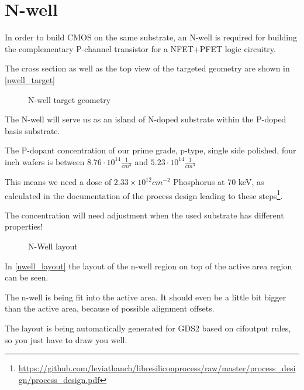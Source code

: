 \section{N-well}\label{nwell_chapter}
In order to build CMOS on the same substrate, an N-well is required for building the complementary P-channel transistor for a NFET+PFET logic circuitry.

The cross section as well as the top view of the targeted geometry are shown in \autoref{nwell_target}

\begin{figure}[H]
	\centering
	\begin{tikzpicture}[node distance = 3cm, auto, thick,scale=\CrossAndTopSectionBig, every node/.style={transform shape}]
		
	\end{tikzpicture}
	\begin{tikzpicture}[node distance = 3cm, auto, thick,scale=\CrossAndTopSectionBig, every node/.style={transform shape}]
		
	\end{tikzpicture}
	\caption{N-well target geometry}
	\label{nwell_target}
\end{figure}

The N-well will serve us as an island of N-doped substrate within the P-doped basis substrate.

The P-dopant concentration of our prime grade, p-type, single side polished, four inch wafers is between $8.76 \cdot 10^14 \frac{1}{cm^3}$ and $5.23 \cdot 10^14 \frac{1}{cm^3}$

This means we need a dose of $2.33\times10^{12}cm^{-2}$ Phosphorus at 70 keV, as calculated in the documentation of the process design leading to these steps\footnote{\url{https://github.com/leviathanch/libresiliconprocess/raw/master/process_design/process_design.pdf}}.

The concentration will need adjustment when the used substrate has different properties!

\begin{figure}[H]
	\centering
	\begin{tikzpicture}[node distance =1cm, auto, thick,scale=\VLSILayout, every node/.style={transform shape}]
		
	\end{tikzpicture}
	\caption{N-Well layout}
	\label{nwell_layout}
\end{figure}

In \autoref{nwell_layout} the layout of the n-well region on top of the active area region can be seen.

The n-well is being fit into the active area. It should even be a little bit bigger than the active area, because of possible alignment offsets.

The layout is being automatically generated for GDS2 based on cifoutput rules, so you just have to draw you well.

\newpage


